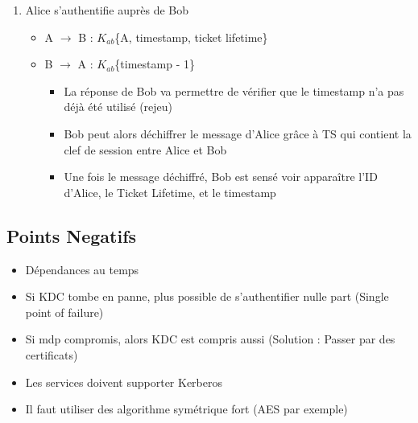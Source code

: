 \documentclass[a4paper]{article}
\begin{document}
\begin{enumerate}
\begin{itemize}[label=, font=\scriptsize]
        \end{itemize}
        \item Alice s'authentifie auprès de Bob
        \begin{itemize}
          \item A $\rightarrow$ B : $K_{ab}$\{A, timestamp, ticket lifetime\}
          \item B $\rightarrow$ A : $K_{ab}$\{timestamp - 1\}
          \begin{itemize}
            \item La réponse de Bob va permettre de vérifier que le timestamp n'a pas déjà été utilisé (rejeu)
            \item Bob peut alors déchiffrer le message d'Alice grâce à TS qui contient la clef de session entre Alice et Bob
            \item Une fois le message déchiffré, Bob est sensé voir apparaître l'ID d'Alice, le Ticket Lifetime, et le timestamp
          \end{itemize}
        \end{itemize}
      \end{enumerate}

      \subsection{Points Negatifs}

      \begin{itemize}
        \item Dépendances au temps
        \item Si KDC tombe en panne, plus possible de s'authentifier nulle part (Single point of failure)
        \item Si mdp compromis, alors KDC est compris aussi (Solution : Passer par des certificats)
        \item Les services doivent supporter Kerberos
        \item Il faut utiliser des algorithme symétrique fort (AES par exemple)
      \end{itemize}
      \newpage
      \tableofcontents
\end{document}
